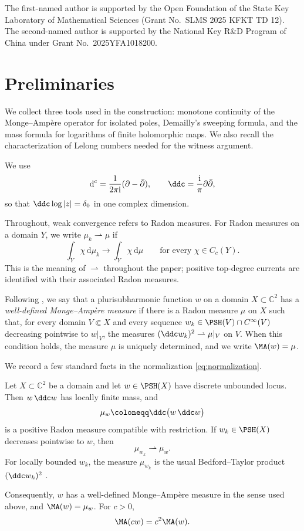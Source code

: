 \documentclass[11pt,a4paper]{article}
\begin{document}
The first-named author is supported by the Open Foundation of the State Key Laboratory of Mathematical Sciences (Grant No.~SLMS 2025 KFKT TD 12).
The second-named author is supported by the National Key R\&D Program of China under Grant No.~2025YFA1018200.

\section{Preliminaries}\label{sec:demailly}

We collect three tools used in the construction: monotone continuity of the Monge--Amp\`ere operator for isolated poles, Demailly's sweeping formula, and the mass formula for logarithms of finite holomorphic maps. We also recall the characterization of Lelong numbers needed for the witness argument.

We use
\begin{equation}\label{eq:normalization}
  \mathrm{d}^{\mathrm{c}}=\frac{1}{2\pi\mathrm{i}}(\partial-\bar\partial),
  \qquad
  \ddc=\frac{\mathrm{i}}{\pi}\partial\bar\partial,
\end{equation}
so that $\ddc\log|z|=\delta_0$ in one complex dimension.

Throughout, weak convergence refers to Radon measures. For Radon measures on a domain $Y$, we write $\mu_k\rightharpoonup\mu$ if
\[
  \int_Y\chi\,\mathrm d\mu_k\longrightarrow
  \int_Y\chi\,\mathrm d\mu
  \qquad\text{for every }\chi\in C_c(Y).
\]
This is the meaning of $\rightharpoonup$ throughout the paper; positive top-degree currents are identified with their associated Radon measures.

Following \cite[Definition~1.1]{DGZ15}, we say that a plurisubharmonic function $w$ on a domain $X\subset\mathbb C^2$ has a \emph{well-defined Monge--Amp\`ere measure} if there is a Radon measure $\mu$ on $X$ such that, for every domain $V\Subset X$ and every sequence $w_k\in\PSH(V)\cap C^\infty(V)$ decreasing pointwise to $w|_V$, the measures $(\ddc w_k)^2\rightharpoonup\mu|_V$ on $V$. When this condition holds, the measure $\mu$ is uniquely determined, and we write $\MA(w)=\mu$.

We record a few standard facts in the normalization \eqref{eq:normalization}.
\begin{proposition}\label{prop:question7-product}
Let $X\subset\mathbb C^2$ be a domain and let $w\in\PSH(X)$ have discrete unbounded locus. Then $w\,\ddc w$ has locally finite mass, and
\[
  \mu_w\coloneqq\ddc\bigl(w\,\ddc w\bigr)
\]
is a positive Radon measure compatible with restriction. If $w_k\in\PSH(X)$ decreases pointwise to $w$, then
\[
  \mu_{w_k}\rightharpoonup\mu_w.
\]
For locally bounded $w_k$, the measure $\mu_{w_k}$ is the usual Bedford--Taylor product $(\ddc w_k)^2$ \cite{BT82}.

Consequently, $w$ has a well-defined Monge--Amp\`ere measure in the sense used above, and $\MA(w)=\mu_w$. For $c>0$,
\begin{equation}\label{eq:ma-homogeneity}
  \MA(cw)=c^2\MA(w).
\end{equation}
\end{proposition}
\end{document}
